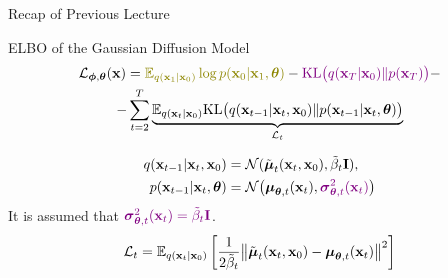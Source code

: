 \documentclass{beamer}
\begin{document}
\begin{frame}{Recap of Previous Lecture}
	\begin{block}{ELBO of the Gaussian Diffusion Model}
		\vspace{-0.7cm}
		\begin{multline*}
			\cL_{\bphi, \btheta}(\bx) =  {\color{olive}\bbE_{q(\bx_1 | \bx_0)} \log p(\bx_0 | \bx_1, \btheta)} - {\color{violet}\KL\bigl(q(\bx_T | \bx_0) \| p(\bx_T)\bigr)} - \\
			- \sum_{t=2}^T  \underbrace{ \bbE_{q(\bx_t | \bx_0)}\KL \bigl(q(\bx_{t-1} | \bx_t, \bx_0) \| p(\bx_{t - 1} | \bx_t, \btheta )\bigr)}_{\cL_t}
		\end{multline*}
		\vspace{-1.0cm}
	\end{block}
	\begin{align*}
		q(\mathbf{x}_{t-1} | \mathbf{x}_t, \mathbf{x}_0) &= \mathcal{N}(\tilde{\boldsymbol{\mu}}_t(\mathbf{x}_t, \mathbf{x}_0), \tilde{\beta}_t \mathbf{I}), \\
		p(\mathbf{x}_{t - 1} | \mathbf{x}_t, \boldsymbol{\theta}) &= \mathcal{N} \bigl(\boldsymbol{\mu}_{\boldsymbol{\theta}, t}(\mathbf{x}_t), {\color{violet}\boldsymbol{\sigma}_{\boldsymbol{\theta}, t}^2(\mathbf{x}_t)}\bigr)
	\end{align*}
	It is assumed that ${\color{violet}\boldsymbol{\sigma}_{\boldsymbol{\theta}, t}^2(\mathbf{x}_t) = \tilde{\beta}_t \mathbf{I}}$.
	\[
		\mathcal{L}_t = \mathbb{E}_{q(\mathbf{x}_t | \mathbf{x}_0)} \left[\frac{1}{2\tilde{\beta}_t} \bigl\| \tilde{\boldsymbol{\mu}}_t(\mathbf{x}_t, \mathbf{x}_0) - \boldsymbol{\mu}_{\boldsymbol{\theta}, t}(\mathbf{x}_t) \bigr\|^2  \right]
	\]
\end{frame}
\end{document}
